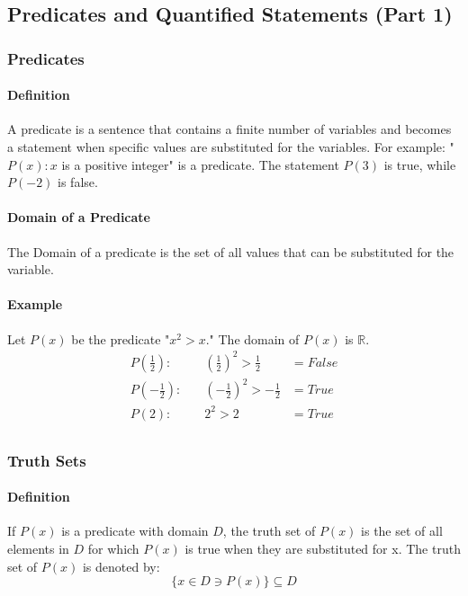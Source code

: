 \subsection{Predicates and Quantified Statements (Part 1)}
\hrulefill

\subsubsection*{Predicates}
\paragraph*{Definition}
A predicate is a sentence that contains a finite number of variables and becomes
a statement when specific values are substituted for the variables. For example: 
"$P(x): x$ is a positive integer" is a predicate. The statement $P(3)$ is true, while $P(-2)$ is false.

\paragraph*{Domain of a Predicate}
The Domain of a predicate is the set of all values that can be substituted for the
variable.

\paragraph*{Example}
Let $P(x)$ be the predicate "$x^2 > x$." The domain of $P(x)$ is $\mathbb{R}$.
\begin{align*}
    P(\frac{1}{2}): &\quad (\frac{1}{2})^2 > \frac{1}{2} &= False\\
    P(-\frac{1}{2}): &\quad (-\frac{1}{2})^2 > -\frac{1}{2} &= True\\
    P(2): &\quad 2^2 > 2 &= True\\
\end{align*}

\subsubsection*{Truth Sets}
\paragraph*{Definition}
If $P(x)$ is a predicate with domain $D$, the truth set of $P(x)$ is the set of all
elements in $D$ for which $P(x)$ is true when they are substituted for x. The truth 
set of $P(x)$ is denoted by:
\begin{equation*}
    \{x \in D \ni P(x)\} \subseteq D
\end{equation*}

